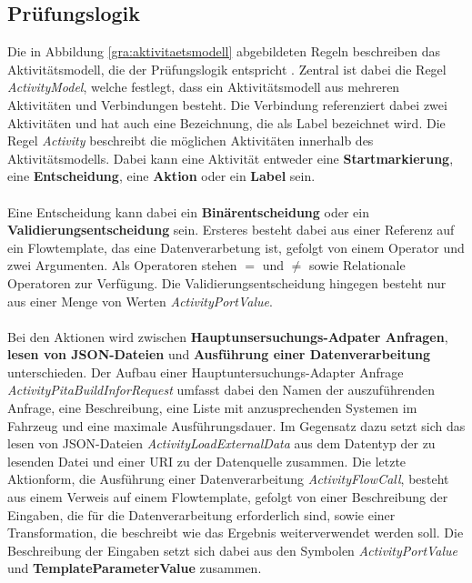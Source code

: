     \subsection{Prüfungslogik}
    \label{sub:pruefungslogik}
    Die in Abbildung \cref{gra:aktivitaetsmodell} abgebildeten Regeln beschreiben das Aktivitätsmodell, die der Prüfungslogik entspricht \cite{99}.
    Zentral ist dabei die Regel \textit{ActivityModel}, welche festlegt, dass ein Aktivitätsmodell aus mehreren Aktivitäten und Verbindungen besteht.
    Die Verbindung referenziert dabei zwei Aktivitäten und hat auch eine Bezeichnung, die als Label bezeichnet wird.
    Die Regel \textit{Activity} beschreibt die möglichen Aktivitäten innerhalb des Aktivitätsmodells. 
    Dabei kann eine Aktivität entweder eine \textbf{Startmarkierung}, eine \textbf{Entscheidung}, eine \textbf{Aktion} oder ein \textbf{Label} sein.\\
    \\
    Eine Entscheidung kann dabei ein \textbf{Binärentscheidung} oder ein \textbf{Validierungsentscheidung} sein.
    Ersteres besteht dabei aus einer Referenz auf ein Flowtemplate, das eine Datenverarbetung ist, gefolgt von einem Operator und zwei Argumenten. 
    Als Operatoren stehen $=$ und $\neq$ sowie Relationale Operatoren zur Verfügung.
    Die Validierungsentscheidung hingegen besteht nur aus einer Menge von Werten \textit{ActivityPortValue}.\\
    \\
    Bei den Aktionen wird zwischen \textbf{Hauptunsersuchungs-Adpater Anfragen}, \textbf{lesen von JSON-Dateien} und \textbf{Ausführung einer Datenverarbeitung } unterschieden.
    Der Aufbau einer Hauptuntersuchungs-Adapter Anfrage \textit{ActivityPitaBuildInforRequest} umfasst dabei den Namen der auszuführenden Anfrage, eine Beschreibung, eine Liste mit anzusprechenden Systemen im Fahrzeug und eine maximale Ausführungsdauer.
    Im Gegensatz dazu setzt sich das lesen von JSON-Dateien \textit{ActivityLoadExternalData}  aus dem Datentyp der zu lesenden Datei und einer URI zu der Datenquelle zusammen.
    Die letzte Aktionform, die Ausführung einer Datenverarbeitung \textit{ActivityFlowCall}, besteht aus einem Verweis auf einem Flowtemplate, gefolgt von einer Beschreibung der Eingaben, die für die Datenverarbeitung erforderlich sind, sowie einer Transformation, die beschreibt wie das Ergebnis weiterverwendet werden soll.    
    Die Beschreibung der Eingaben setzt sich dabei aus den Symbolen \textit{ActivityPortValue} und \textbf{TemplateParameterValue} zusammen.\\
